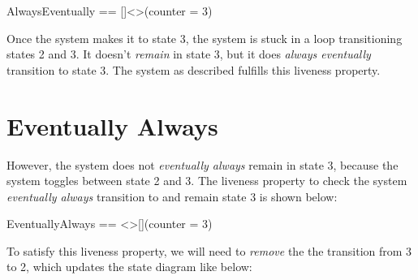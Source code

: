 \begin{tla}
    AlwaysEventually == []<>(counter = 3)
\end{tla}
\begin{tlatex}
\end{tlatex}
\newline

Once the system makes it to state 3, the system is stuck in a loop transitioning
states 2 and 3. It doesn't \textit{remain} in state 3, but it does \textit{always
eventually} transition to state 3. The system as described fulfills this liveness
property.

\section{Eventually Always}

However, the system does not \textit{eventually always} remain in state 3, because
the system toggles between state 2 and 3. The liveness property to check the
system \textit{eventually always} transition to and remain state 3 is shown
below:\\

\begin{tla}
    EventuallyAlways == <>[](counter = 3)
\end{tla}
\begin{tlatex}
\end{tlatex}
\newline

To satisfy this liveness property, we will need to \textit{remove} the
the transition from 3 to 2, which updates the state diagram like below:

\begin{center}
\end{center}

